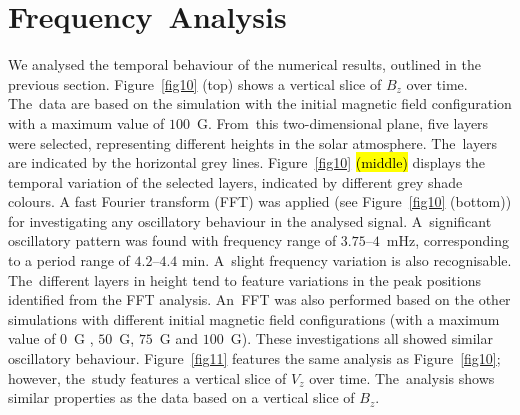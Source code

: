 \documentclass[physics,article,accept,pdftex,moreauthors]{Definitions/mdpi}
\begin{document}

\section{Frequency~Analysis}

 We analysed the temporal behaviour of the numerical results, outlined in the previous section. %
Figure~\ref{fig10} {(top)} %
shows a vertical slice of %
 {$B_z$} %
over time.  The~data are based on the simulation with the initial magnetic field configuration with a maximum value of $100$~G. 
 {From}~this two-dimensional plane, five layers were selected, representing different heights in the solar atmosphere. 
The~layers are indicated by the horizontal grey lines.   %
Figure~\ref{fig10} \hl{(middle)} 
displays the temporal variation of the selected layers, indicated by different grey shade colours. 
A %
 {fast Fourier transform %
(FFT)} was applied ({see} %
Figure~\ref{fig10} {(bottom)}) 
 for investigating any oscillatory behaviour in the analysed signal. A~significant 
oscillatory pattern was found with frequency range of $3.75$--$4$~mHz, corresponding to a period range of $4.2$--$4.4$ min. 
A~slight frequency variation is also recognisable. The~different layers in height tend to feature variations in the peak positions 
identified from the FFT analysis. An~FFT was also performed based on the other simulations with different initial magnetic field 
configurations (with a maximum value of $0$~G , $50$~G,  $75$~G  and $100$~G). These investigations all showed similar oscillatory behaviour.  
Figure~\ref{fig11} features the same analysis as Figure~\ref{fig10}; however, the~study features a vertical slice of 
 {$V_z$} %
over time. The~analysis shows similar properties as the data based on a vertical slice of 
 {$B_z$.}
 
\end{document}
